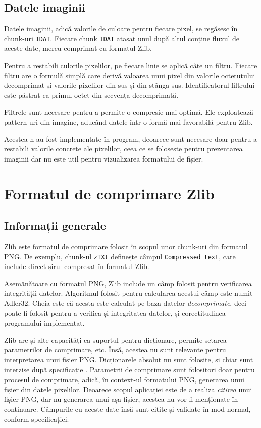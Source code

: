 \documentclass[a4paper,12pt]{report}
\begin{document}
\subsection{Datele imaginii}

Datele imaginii, adică valorile de culoare pentru fiecare pixel, se regăsesc în chunk-uri \texttt{IDAT}.
Fiecare chunk \texttt{IDAT} atașat unul după altul conține fluxul de aceste date, mereu comprimat cu formatul Zlib.

Pentru a restabili culorile pixelilor, pe fiecare linie se aplică câte un filtru.
Fiecare filtru are o formulă simplă care derivă valoarea unui pixel
din valorile octetutului decomprimat și valorile pixelilor din sus și din stânga-sus.
Identificatorul filtrului este păstrat ca primul octet din secvența decomprimată. 

Filtrele sunt necesare pentru a permite o compresie mai optimă.
Ele exploatează pattern-uri din imagine, aducând datele într-o formă mai favorabilă pentru Zlib.

Acestea n-au fost implementate în program, deoarece sunt necesare
doar pentru a restabili valorile concrete ale pixelilor,
ceea ce se folosește pentru prezentarea imaginii dar nu este util pentru vizualizarea formatului de fișier.

\section{Formatul de comprimare Zlib}

\subsection{Informații generale}

Zlib este formatul de comprimare folosit în scopul unor chunk-uri din formatul \ac{PNG}.
De exemplu, chunk-ul \texttt{zTXt} definește câmpul \texttt{Compressed text},
care include direct șirul compresat în formatul Zlib.

Asemănătoare cu formatul \ac{PNG}, Zlib include un câmp folosit pentru verificarea integrității datelor.
Algoritmul folosit pentru calcularea acestui câmp este numit Adler32.
Cheia este că acesta este calculat pe baza datelor \textit{decomprimate},
deci poate fi folosit pentru a verifica și integritatea datelor, și corectitudinea programului implementat.

Zlib are și alte capacități ca suportul pentru dicționare, permite setarea parametrilor de comprimare, etc.
Însă, acestea nu sunt relevante pentru interpretarea unui fișier \ac{PNG}.
Dicționarele absolut nu sunt folosite, și chiar sunt interzise după specificație \cite{png_spec_chapter_deflate}.
Parametrii de comprimare sunt folositori doar pentru procesul de comprimare,
adică, în context-ul formatului \ac{PNG}, generarea unui fișier din datele pixelilor.
Deoarece scopul aplicației este de a realiza \textit{citirea} unui fișier \ac{PNG},
dar nu generarea unui așa fișier, acestea nu vor fi menționate în continuare.
Câmpurile cu aceste date însă sunt citite și validate în mod normal, conform specificației.
\end{document}
